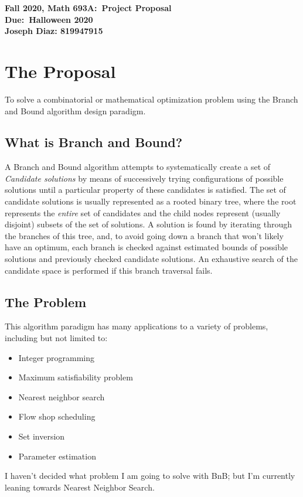 \documentclass{article}
\begin{document}
	\begin{center}
		\textbf{Fall 2020, Math 693A:\ Project Proposal} \\
		\textbf{Due:\ Halloween 2020} \\
		\textbf{Joseph Diaz: 819947915}
	\end{center}
\noindent\makebox[\linewidth]{\rule{\paperwidth}{0.4pt}}
\section*{The Proposal}
To solve a combinatorial or mathematical optimization 
problem using the Branch and Bound algorithm design paradigm.
\subsection*{What is Branch and Bound?}
A Branch and Bound algorithm attempts to systematically create a set
of \emph{Candidate solutions} by means of successively trying configurations
of possible solutions until a particular property of these candidates is
satisfied. The set of candidate solutions is usually represented as a 
rooted binary tree, where the root represents the \emph{entire} set of 
candidates and the child nodes represent (usually disjoint) subsets of the
set of solutions. A solution is found by iterating through the branches of
this tree, and, to avoid going down a branch that won't likely have an 
optimum, each branch is checked against estimated bounds of possible 
solutions and previously checked candidate solutions. An exhaustive search
of the candidate space is performed if this branch traversal fails.
\subsection*{The Problem}
This algorithm paradigm has many applications to a variety of problems, including but not limited to:
\begin{itemize}
    \item Integer programming
    \item Maximum satisfiability problem
    \item Nearest neighbor search
    \item Flow shop scheduling
    \item Set inversion
    \item Parameter estimation
\end{itemize}
I haven't decided what problem I am going to solve with BnB; but I'm 
currently leaning towards Nearest Neighbor Search.

\noindent\makebox[\linewidth]{\rule{\paperwidth}{0.4pt}}
	
\end{document}
